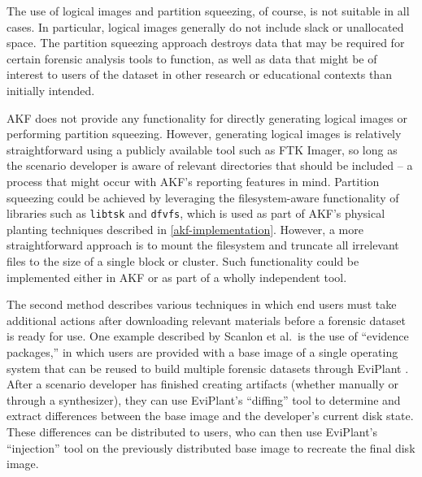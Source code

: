 \documentclass[letterpaper,12pt]{report}
\newcommand{\passthrough}[1]{#1}
\begin{document}
The use of logical images and partition squeezing, of course, is not
suitable in all cases. In particular, logical images generally do not
include slack or unallocated space. The partition squeezing approach
destroys data that may be required for certain forensic analysis tools
to function, as well as data that might be of interest to users of the
dataset in other research or educational contexts than initially
intended.

AKF does not provide any functionality for directly generating logical
images or performing partition squeezing. However, generating logical
images is relatively straightforward using a publicly available tool
such as FTK Imager, so long as the scenario developer is aware of
relevant directories that should be included -- a process that might
occur with AKF's reporting features in mind. Partition squeezing could
be achieved by leveraging the filesystem-aware functionality of
libraries such as \passthrough{\lstinline!libtsk!} and
\passthrough{\lstinline!dfvfs!}, which is used as part of AKF's physical
planting techniques described in \autoref{akf-implementation}. However, a more straightforward approach is to
mount the filesystem and truncate all irrelevant files to the size of a
single block or cluster. Such functionality could be implemented either
in AKF or as part of a wholly independent tool.

The second method describes various techniques in which end users must
take additional actions after downloading relevant materials before a
forensic dataset is ready for use. One example described by Scanlon et
al.~is the use of ``evidence packages,'' in which users are provided
with a base image of a single operating system that can be reused to
build multiple forensic datasets through EviPlant
\cite{scanlonEviPlantEfficientDigital2017}. After a scenario
developer has finished creating artifacts (whether manually or through a
synthesizer), they can use EviPlant's ``diffing'' tool to determine and
extract differences between the base image and the developer's current
disk state. These differences can be distributed to users, who can then
use EviPlant's ``injection'' tool on the previously distributed base
image to recreate the final disk image.
\end{document}
